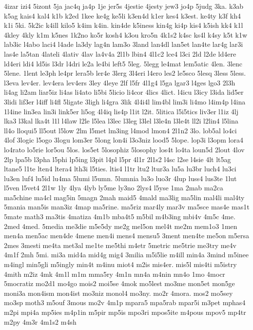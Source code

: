{4izar
izi4
5izont
5ja
jac4q
ja4p
1je
jer5s
4jestie
4jesty
jew3
jo4p
5judg
3ka.
k3ab
k5ag
kais4
kal4
k1b
k2ed
1kee
ke4g
ke5li
k3en4d
k1er
kes4
k3est.
ke4ty
k3f
kh4
k1i
5ki.
5k2ic
k4ill
kilo5
k4im
k4in.
kin4de
k5iness
kin4g
ki4p
kis4
k5ish
kk4
k1l
4kley
4kly
k1m
k5nes
1k2no
ko5r
kosh4
k3ou
kro5n
4k1s2
k4sc
ks4l
k4sy
k5t
k1w
lab3ic
l4abo
laci4
l4ade
la3dy
lag4n
lam3o
3land
lan4dl
lan5et
lan4te
lar4g
lar3i
las4e
la5tan
4lateli
4lativ
4lav
la4v4a
2l1b
lbin4
4l1c2
lce4
l3ci
2ld
l2de
ld4ere
ld4eri
ldi4
ld5is
l3dr
l4dri
le2a
le4bi
left5
5leg.
5legg
le4mat
lem5atic
4len.
3lenc
5lene.
1lent
le3ph
le4pr
lera5b
ler4e
3lerg
3l4eri
l4ero
les2
le5sco
5lesq
3less
5less.
l3eva
lev4er.
lev4era
lev4ers
3ley
4leye
2lf
l5fr
4l1g4
l5ga
lgar3
l4ges
lgo3
2l3h
li4ag
li2am
liar5iz
li4as
li4ato
li5bi
5licio
li4cor
4lics
4lict.
l4icu
l3icy
l3ida
lid5er
3lidi
lif3er
l4iff
li4fl
5ligate
3ligh
li4gra
3lik
4l4i4l
lim4bl
lim3i
li4mo
l4im4p
l4ina
1l4ine
lin3ea
lin3i
link5er
li5og
4l4iq
lis4p
l1it
l2it.
5litica
l5i5tics
liv3er
l1iz
4lj
lka3
l3kal
lka4t
l1l
l4law
l2le
l5lea
l3lec
l3leg
l3lel
l3le4n
l3le4t
ll2i
l2lin4
l5lina
ll4o
lloqui5
ll5out
l5low
2lm
l5met
lm3ing
l4mod
lmon4
2l1n2
3lo.
lob5al
lo4ci
4lof
3logic
l5ogo
3logu
lom3er
5long
lon4i
l3o3niz
lood5
5lope.
lop3i
l3opm
lora4
lo4rato
lo5rie
lor5ou
5los.
los5et
5losophiz
5losophy
los4t
lo4ta
loun5d
2lout
4lov
2lp
lpa5b
l3pha
l5phi
lp5ing
l3pit
l4pl
l5pr
4l1r
2l1s2
l4sc
l2se
l4sie
4lt
lt5ag
ltane5
l1te
lten4
ltera4
lth3i
l5ties.
ltis4
l1tr
ltu2
ltur3a
lu5a
lu3br
luch4
lu3ci
lu3en
luf4
lu5id
lu4ma
5lumi
l5umn.
5lumnia
lu3o
luo3r
4lup
luss4
lus3te
1lut
l5ven
l5vet4
2l1w
1ly
4lya
4lyb
ly5me
ly3no
2lys4
l5yse
1ma
2mab
ma2ca
ma5chine
ma4cl
mag5in
5magn
2mah
maid5
4mald
ma3lig
ma5lin
mal4li
mal4ty
5mania
man5is
man3iz
4map
ma5rine.
ma5riz
mar4ly
mar3v
ma5sce
mas4e
mas1t
5mate
math3
ma3tis
4matiza
4m1b
mba4t5
m5bil
m4b3ing
mbi4v
4m5c
4me.
2med
4med.
5media
me3die
m5e5dy
me2g
mel5on
mel4t
me2m
mem1o3
1men
men4a
men5ac
men4de
4mene
men4i
mens4
mensu5
3ment
men4te
me5on
m5ersa
2mes
3mesti
me4ta
met3al
me1te
me5thi
m4etr
5metric
me5trie
me3try
me4v
4m1f
2mh
5mi.
mi3a
mid4a
mid4g
mig4
3milia
m5i5lie
m4ill
min4a
3mind
m5inee
m4ingl
min5gli
m5ingly
min4t
m4inu
miot4
m2is
mis4er.
mis5l
mis4ti
m5istry
4mith
m2iz
4mk
4m1l
m1m
mma5ry
4m1n
mn4a
m4nin
mn4o
1mo
4mocr
5mocratiz
mo2d1
mo4go
mois2
moi5se
4mok
mo5lest
mo3me
mon5et
mon5ge
moni3a
mon4ism
mon4ist
mo3niz
monol4
mo3ny.
mo2r
4mora.
mos2
mo5sey
mo3sp
moth3
m5ouf
3mous
mo2v
4m1p
mpara5
mpa5rab
mpar5i
m3pet
mphas4
m2pi
mpi4a
mp5ies
m4p1in
m5pir
mp5is
mpo3ri
mpos5ite
m4pous
mpov5
mp4tr
m2py
4m3r
4m1s2
m4sh
}
